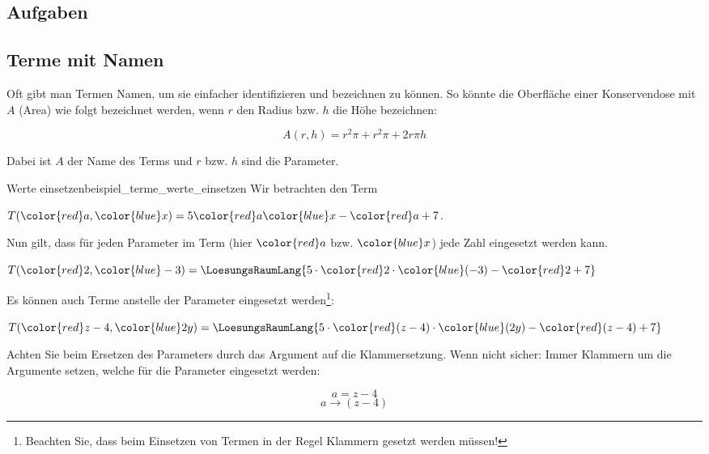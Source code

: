 

\subsection*{Aufgaben}

\newpage
\subsection{Terme mit Namen}
Oft gibt man Termen Namen, um sie einfacher identifizieren und
bezeichnen zu können. So könnte \zB die Oberfläche einer
Konservendose mit $A$ (Area) wie folgt bezeichnet werden, wenn $r$ den
Radius bzw. $h$ die Höhe bezeichnen:

$$A(r, h) = r^2\pi + r^2\pi + 2r\pi{}h$$

Dabei ist $A$ der Name des Terms und $r$ bzw. $h$ sind die Parameter.
\vspace{3mm}
\begin{beispiel}{Werte einsetzen}{beispiel_terme_werte_einsetzen}
  Wir betrachten den Term

  $T({\color{red}a}, {\color{blue}x}) = 5{\color{red}a}{\color{blue}x} - {\color{red}a} + 7$.

  Nun gilt, dass für jeden Parameter im Term (hier ${\color{red}a}$
  bzw. ${\color{blue}x}$) jede Zahl eingesetzt
  werden kann.\leserluft{}

  $T({\color{red}2}, {\color{blue}-3}) = \LoesungsRaumLang{5\cdot{}{\color{red}2}\cdot{\color{blue}(-3)} - {\color{red}2} + 7}$

  Es können auch Terme anstelle der Parameter eingesetzt
  werden\footnote{Beachten Sie, dass beim Einsetzen von Termen in der Regel
  Klammern gesetzt werden müssen!}:\leserluft{}

  $T({\color{red}z-4}, {\color{blue}2y}) =
  \LoesungsRaumLang{5 \cdot{} {\color{red}(z-4)} \cdot {\color{blue}(2y)} - {\color{red}(z-4)} + 7}$
\end{beispiel}

\begin{bemerkung}{}{}
Achten Sie beim Ersetzen des Parameters durch das Argument auf die
Klammersetzung. Wenn nicht sicher: Immer Klammern um die Argumente
setzen, welche für die Parameter eingesetzt werden:

$$ a = z-4$$
$$ a  \rightarrow (z-4)$$
\end{bemerkung}
\newpage

